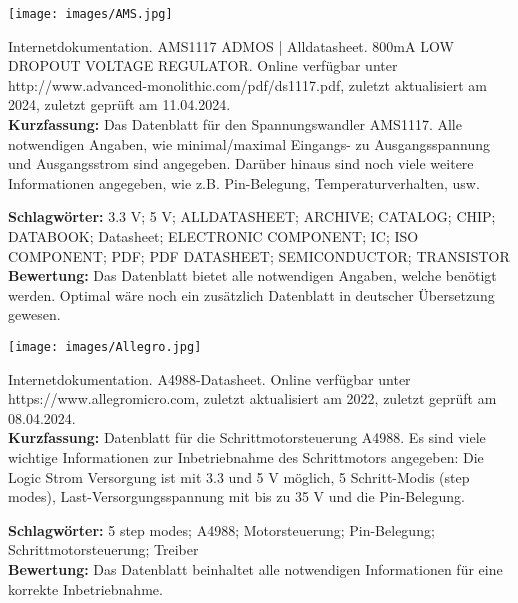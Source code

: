 {
\begin{minipage}{0.38\textwidth}
	\texttt{[image: images/AMS.jpg]}
\end{minipage}
\hfill
\begin{minipage}{0.6\textwidth}
Internetdokumentation. AMS1117 ADMOS | Alldatasheet. 800mA LOW DROPOUT VOLTAGE REGULATOR.
Online verfügbar unter http://www.advanced-monolithic.com/pdf/ds1117.pdf, zuletzt aktualisiert am 2024, zuletzt geprüft am 11.04.2024.
\\ \textbf{Kurzfassung:}
Das Datenblatt für den Spannungswandler AMS1117. Alle notwendigen Angaben, wie minimal/maximal Eingangs- zu Ausgangsspannung und Ausgangsstrom sind angegeben. Darüber hinaus sind noch viele weitere Informationen angegeben, wie z.B. Pin-Belegung, Temperaturverhalten, usw.
\end{minipage}
\textbf{Schlagwörter:}
3.3 V; 5 V; ALLDATASHEET; ARCHIVE; CATALOG; CHIP; DATABOOK; Datasheet; ELECTRONIC COMPONENT; IC; ISO COMPONENT; PDF; PDF DATASHEET; SEMICONDUCTOR; TRANSISTOR
\\ \textbf{Bewertung:}
Das Datenblatt bietet alle notwendigen Angaben, welche benötigt werden. Optimal wäre noch ein zusätzlich Datenblatt in deutscher Übersetzung gewesen.
}

{
\begin{minipage}{0.38\textwidth}
	\texttt{[image: images/Allegro.jpg]}
\end{minipage}
\hfill
\begin{minipage}{0.6\textwidth}
Internetdokumentation. A4988-Datasheet.
Online verfügbar unter https://www.allegromicro.com, zuletzt aktualisiert am 2022, zuletzt geprüft am 08.04.2024.
\\ \textbf{Kurzfassung:}
Datenblatt für die Schrittmotorsteuerung A4988. Es sind viele wichtige Informationen zur Inbetriebnahme des Schrittmotors angegeben: Die Logic Strom Versorgung ist mit 3.3 und 5 V möglich, 5 Schritt-Modis (step modes), Last-Versorgungsspannung mit bis zu 35 V und die Pin-Belegung.
\end{minipage}
\textbf{Schlagwörter:}
5 step modes; A4988; Motorsteuerung; Pin-Belegung; Schrittmotorsteuerung; Treiber
\\ \textbf{Bewertung:}
Das Datenblatt beinhaltet alle notwendigen Informationen für eine korrekte Inbetriebnahme.
}

